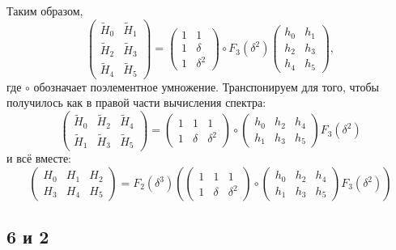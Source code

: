 Таким образом,
\[
    \begin{pmatrix}
        \widetilde{H}_0 & \widetilde{H}_1 \\
        \widetilde{H}_2 & \widetilde{H}_3 \\
        \widetilde{H}_4 & \widetilde{H}_5
    \end{pmatrix}
    =
    \begin{pmatrix}
        1 & 1        \\
        1 & \delta   \\
        1 & \delta^2
    \end{pmatrix}
    \circ
    F_3(\delta^2)
    \begin{pmatrix}
        h_0 & h_1 \\
        h_2 & h_3 \\
        h_4 & h_5
    \end{pmatrix} ,
\]
где $\circ$ обозначает поэлементное умножение. Транспонируем для того, чтобы получилось как в правой части вычисления спектра:
\[
    \begin{pmatrix}
        \widetilde{H}_0 & \widetilde{H}_2 & \widetilde{H}_4 \\
        \widetilde{H}_1 & \widetilde{H}_3 & \widetilde{H}_5
    \end{pmatrix}
    =
    \begin{pmatrix}
        1 & 1      & 1        \\
        1 & \delta & \delta^2
    \end{pmatrix}
    \circ
    \begin{pmatrix}
        h_0 & h_2 & h_4 \\
        h_1 & h_3 & h_5
    \end{pmatrix}
    F_3(\delta^2)
\]
и всё вместе:
\[
    \begin{pmatrix}
        H_0 & H_1 & H_2 \\
        H_3 & H_4 & H_5
    \end{pmatrix}
    =
    F_2(\delta^3)
    \left(
    \begin{pmatrix}
        1 & 1      & 1        \\
        1 & \delta & \delta^2
    \end{pmatrix}
    \circ
    \begin{pmatrix}
        h_0 & h_2 & h_4 \\
        h_1 & h_3 & h_5
    \end{pmatrix}
    F_3(\delta^2)
    \right)
\]

\subsection{6 и 2}

